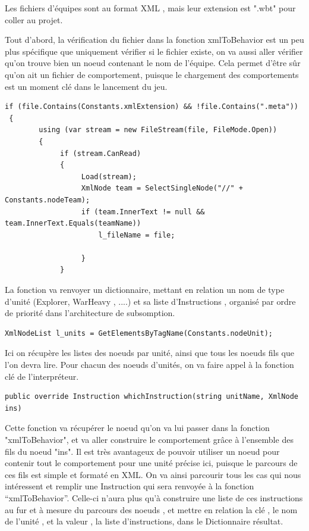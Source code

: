 \documentclass{report}
\begin{document}
Les fichiers d'équipes sont au format XML , mais leur extension est ".wbt" pour coller au projet.

Tout d'abord, la vérification du fichier dans la fonction xmlToBehavior est un peu plus spécifique que uniquement vérifier si le fichier existe, on va aussi aller vérifier qu'on trouve bien un noeud contenant le nom de l'équipe. Cela permet d'être sûr qu'on ait un fichier de comportement, puisque le chargement des comportements est un moment clé dans le lancement du jeu.

\begin{lstlisting}[frame=single]
 if (file.Contains(Constants.xmlExtension) && !file.Contains(".meta"))
 {
        using (var stream = new FileStream(file, FileMode.Open))
        {
             if (stream.CanRead)
             {
                  Load(stream);
                  XmlNode team = SelectSingleNode("//" + Constants.nodeTeam);
                  if (team.InnerText != null && team.InnerText.Equals(teamName))
                      l_fileName = file;

                  }
             }

\end{lstlisting}


La fonction va renvoyer un dictionnaire, mettant en relation un nom de type d'unité (Explorer, WarHeavy , ....) et sa liste d'Instructions , organisé par ordre de priorité dans l'architecture de subsomption.

\begin{lstlisting}[frame=single]
XmlNodeList l_units = GetElementsByTagName(Constants.nodeUnit);
\end{lstlisting}

Ici on récupère les listes des noeuds par unité, ainsi que tous les noeuds fils que l’on devra lire.
Pour chacun des noeuds d'unités, on va faire appel à la fonction clé de l'interpréteur.

\begin{lstlisting}[frame=single]
public override Instruction whichInstruction(string unitName, XmlNode ins)
\end{lstlisting}

Cette fonction va récupérer le noeud qu'on va lui passer dans la fonction "xmlToBehavior", et va aller construire le comportement grâce à l'ensemble des fils du noeud "ins".
Il est très avantageux de pouvoir utiliser un noeud pour contenir tout le comportement pour une unité précise ici, puisque le parcours de ces fils est simple et formaté en XML. 
On va ainsi parcourir tous les cas qui nous intéressent  et remplir une Instruction qui sera renvoyée à la fonction “xmlToBehavior”.
Celle-ci n’aura plus qu'à construire une liste de ces instructions au fur et à mesure du parcours des noeuds , et mettre en relation la clé , le nom de l’unité , et la valeur , la liste d’instructions, dans le Dictionnaire résultat.
\end{document}
